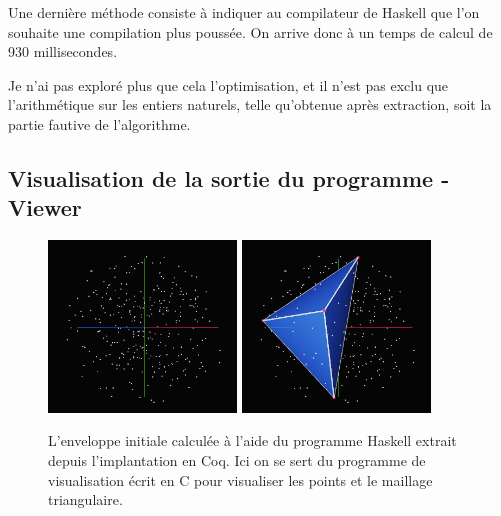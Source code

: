 \documentclass[]{article}
\begin{document}
Une dernière méthode consiste à indiquer au compilateur de Haskell que l'on souhaite une compilation plus poussée. On arrive donc à un temps de calcul de 930 millisecondes.

Je n'ai pas exploré plus que cela l'optimisation, et il n'est pas exclu que l'arithmétique sur les entiers naturels, telle qu'obtenue après extraction, soit la partie fautive de l'algorithme.

\subsection{Visualisation de la sortie du programme - Viewer}

\begin{figure}[H]
	\begin{center}
		\includegraphics[width=5cm]{viewer/screen0.png}
		\includegraphics[width=5cm]{viewer/screen1.png}
	\end{center}
	\caption{L'enveloppe initiale calculée à l'aide du programme Haskell extrait depuis l'implantation en Coq. Ici on se sert du programme de visualisation écrit en C pour visualiser les points et le maillage triangulaire.}
	\label{fig:env_initiale_haskell}
\end{figure}
\end{document}
